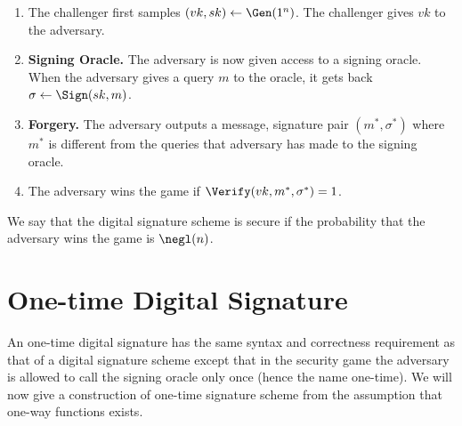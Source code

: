 \begin{enumerate}
    \item The challenger first samples $(vk,sk) \gets \Gen(1^n)$. The challenger gives $vk$ to the adversary.
    \item \textbf{Signing Oracle.} The adversary is now given access to a signing oracle. When the adversary gives a query $m$ to the oracle, it gets back $\sigma \gets \Sign(sk,m)$.
    \item \textbf{Forgery.} The adversary outputs a message, signature pair $(m^*,\sigma^*)$ where $m^*$ is different from the queries that adversary has made to the signing oracle.
    \item The adversary wins the game if $\Verify(vk,m^*,\sigma^*) = 1$.
\end{enumerate}
We say that the digital signature scheme is secure if the probability that the adversary wins the game is $\negl(n)$.

\section{One-time Digital Signature}
\label{lampart}
An one-time digital signature has the same syntax and correctness requirement as that of a digital signature scheme except that in the security game the adversary is allowed to call the signing oracle only once (hence the name one-time). We will now give a construction of one-time signature scheme from the assumption that one-way functions exists.

